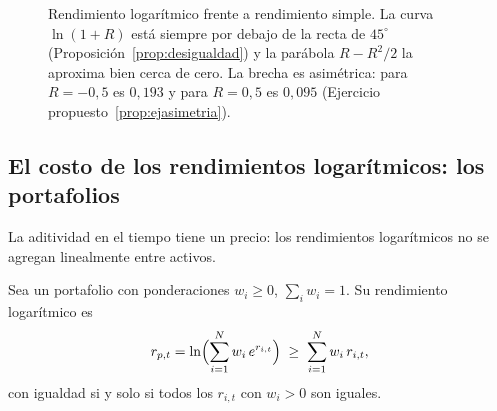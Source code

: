 \begin{figure}[ht]
\centering
{}
\caption{Rendimiento logarítmico frente a rendimiento simple. La curva $\ln(1+R)$ está siempre por
debajo de la recta de $45^\circ$ (Proposición~\ref{prop:desigualdad}) y la parábola $R-R^2/2$ la
aproxima bien cerca de cero. La brecha es asimétrica: para $R=-0{,}5$ es $0{,}193$ y para $R=0{,}5$ es
$0{,}095$ (Ejercicio propuesto~\ref{prop:ejasimetria}).}
\label{fig:logsimple}
\end{figure}

\subsection{El costo de los rendimientos logarítmicos: los portafolios}

La aditividad en el tiempo tiene un precio: los rendimientos logarítmicos no se agregan linealmente
entre activos.

\begin{proposicion}\label{prop:logport}
Sea un portafolio con ponderaciones $w_i\ge 0$, $\sum_iw_i=1$. Su rendimiento logarítmico es
\[
  r_{p,t}=\ln\Bigl(\sum_{i=1}^Nw_i\,e^{r_{i,t}}\Bigr)\;\ge\;\sum_{i=1}^Nw_i\,r_{i,t},
\]
con igualdad si y solo si todos los $r_{i,t}$ con $w_i>0$ son iguales.
\end{proposicion}

